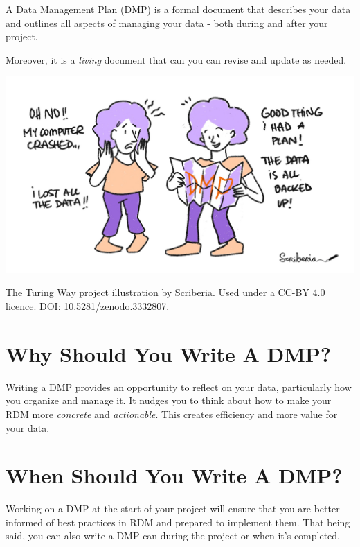 \documentclass[
  letterpaper,
  DIV=11,
  numbers=noendperiod]{scrreprt}
\begin{document}

A Data Management Plan (DMP) is a formal document that describes your
data and outlines all aspects of managing your data - both during and
after your project.

Moreover, it is a \emph{living} document that can you can revise and
update as needed.

\includegraphics{images/data-management-plan.jpg}

The Turing Way project illustration by Scriberia. Used under a CC-BY 4.0
licence. DOI: 10.5281/zenodo.3332807.

\hypertarget{why-should-you-write-a-dmp}{%
\section*{Why Should You Write A
DMP?}\label{why-should-you-write-a-dmp}}


Writing a DMP provides an opportunity to reflect on your data,
particularly how you organize and manage it. It nudges you to think
about how to make your RDM more \emph{concrete} and \emph{actionable}.
This creates efficiency and more value for your data.

\hypertarget{when-should-you-write-a-dmp}{%
\section*{When Should You Write A
DMP?}\label{when-should-you-write-a-dmp}}


Working on a DMP at the start of your project will ensure that you are
better informed of best practices in RDM and prepared to implement them.
That being said, you can also write a DMP can during the project or when
it's completed.
\end{document}
